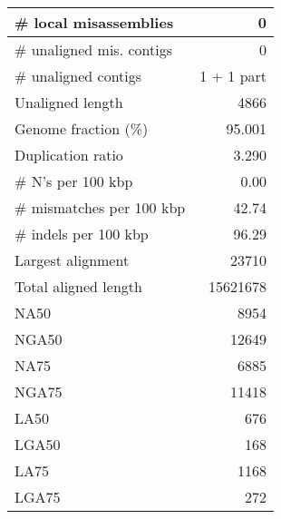 \documentclass[12pt,a4paper]{article}
\begin{document}
\begin{table}[ht]
\begin{center}
\begin{tabular}{|l*{1}{|r}|}
\# local misassemblies & 0 \\ \hline
\# unaligned mis. contigs & 0 \\ \hline
\# unaligned contigs & 1 + 1 part \\ \hline
Unaligned length & 4866 \\ \hline
Genome fraction (\%) & 95.001 \\ \hline
Duplication ratio & 3.290 \\ \hline
\# N's per 100 kbp & 0.00 \\ \hline
\# mismatches per 100 kbp & 42.74 \\ \hline
\# indels per 100 kbp & 96.29 \\ \hline
Largest alignment & 23710 \\ \hline
Total aligned length & 15621678 \\ \hline
NA50 & 8954 \\ \hline
NGA50 & 12649 \\ \hline
NA75 & 6885 \\ \hline
NGA75 & 11418 \\ \hline
LA50 & 676 \\ \hline
LGA50 & 168 \\ \hline
LA75 & 1168 \\ \hline
LGA75 & 272 \\ \hline
\end{tabular}
\end{center}
\end{table}
\end{document}
